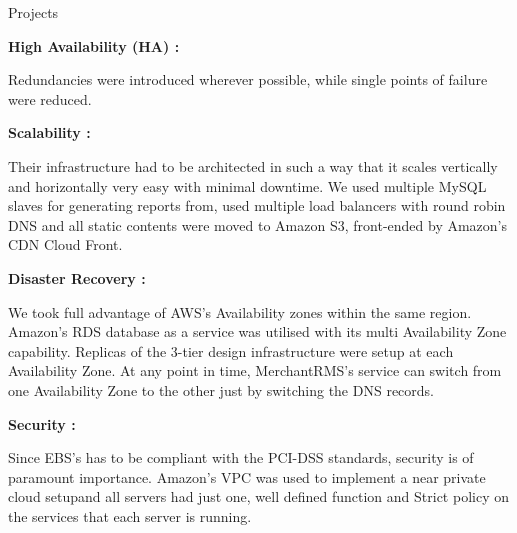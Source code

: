 \documentclass[a4paper,12pt]{article}
\begin{document}
\begin{resumeblock}{Projects}
{\textbf{High Availability (HA) :}

Redundancies were introduced wherever possible, while single points of failure were reduced.

\textbf{Scalability :}

Their infrastructure had to be architected in such a way that it scales vertically and horizontally very easy with minimal downtime. We used multiple MySQL slaves for generating reports from, used multiple load balancers with round robin DNS and all static contents were moved to Amazon S3, front-ended by Amazon’s CDN Cloud Front. 

\textbf{Disaster Recovery :}

We took full advantage of AWS’s Availability zones within the same region. Amazon’s RDS database as a service was utilised with its multi Availability Zone capability. Replicas of the 3-tier design infrastructure were setup at each Availability Zone. At any point in time, MerchantRMS's service can switch from one Availability Zone to the other just by switching the DNS records. 

\textbf{Security :} 

Since EBS’s has to be compliant with the PCI-DSS standards, security is of paramount importance. Amazon’s VPC was used to implement a near private cloud setupand all servers had just one, well defined function and Strict policy on the services that each server is running.}
\largeskip

\largeskip
\end{resumeblock}
\end{document}

